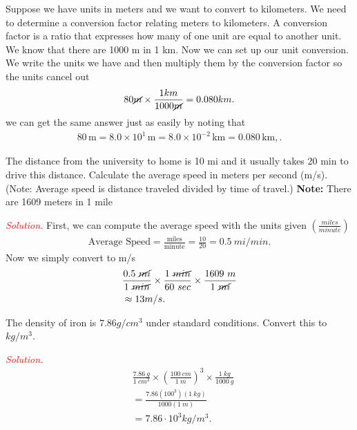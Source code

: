 \documentclass{report}
\begin{document}
    \pagebreak 
    \bigbreak \noindent 
    Suppose we have units in meters and we want to convert to kilometers. We need to determine a conversion factor relating meters to kilometers. A conversion factor is a ratio that expresses how many of one unit are equal to another unit. We know that there are 1000 m in 1 km. Now we can set up our unit conversion. We write the units we have and then multiply them by the conversion factor so the units cancel out 
    \begin{align*}
        80 \cancel{m} \times \frac{1km}{1000\cancel{m}} = 0.080km
    .\end{align*}
    \bigbreak \noindent 
    we can get the same answer just as easily by noting that
    \begin{align*}
        80 \, \text{m} = 8.0 \times 10^1 \, \text{m} = 8.0 \times 10^{-2} \, \text{km} = 0.080 \, \text{km},
    .\end{align*}
    \bigbreak \noindent 
    \begin{exm}
        The distance from the university to home is 10 mi and it usually takes 20 min to drive this distance. Calculate the average speed in meters per second (m/s). (Note: Average speed is distance traveled divided by time of travel.)
        \bigbreak \noindent 
        \textbf{Note:} There are 1609 meters in 1 mile
    \end{exm}
    \bigbreak \noindent 
    \textcolor{red}{\textit{Solution.}} 
    First, we can compute the average speed with the units given $\left(\frac{miles}{minute}\right)$
    \begin{align*}
        \text{Average Speed} = \frac{\text{miles}}{\text{minute}} = \frac{10}{20} = 0.5\ mi/min
    .\end{align*}
    \bigbreak \noindent 
    Now we simply convert to m/s
    \begin{align*}
        &\frac{0.5\ \cancel{mi}}{1\ \cancel{min}} \times \frac{1\ \cancel{min}}{60\ sec} \times \frac{1609\ m}{1\ \cancel{mi}} \\
        &\approx 13 m/s
    .\end{align*}
    \bigbreak \noindent 
    \begin{exm}
        The density of iron is  $7.86 g/cm^{3}$ under standard conditions. Convert this to $kg/m^{3}$.
    \end{exm}
    \bigbreak \noindent 
    \textcolor{red}{\textit{Solution.}}
    \begin{align*}
        &\frac{7.86\ g}{1\ cm^{3}} \times \left(\frac{100\ cm}{1\ m}\right)^{3} \times \frac{1\ kg}{1000\ g} \\
        &= \frac{7.86(100^{3})(1\ kg)}{1000(1\ m)} \\
        &=7.86 \cdot 10^{3} kg/m^{3}
    .\end{align*}
\end{document}
